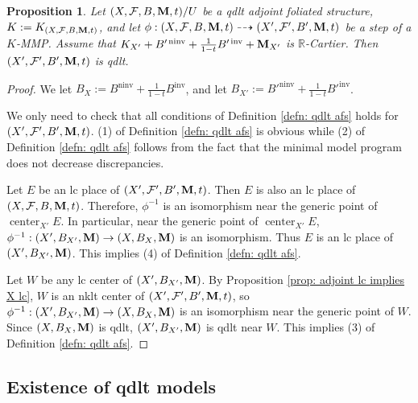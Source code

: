 \documentclass[12pt]{amsart}
\numberwithin{equation}{section}
\newcommand{\Mm}{{\bf{M}}}
\newcommand{\Rr}{\mathbb{R}}
\newcommand{\Center}{\operatorname{center}}
\newcommand{\ninv}{\operatorname{ninv}}
\newcommand{\inv}{\operatorname{inv}}
\newcommand{\Ff}{\mathcal{F}}
\newtheorem{prop}[thm]{Proposition}
\theoremstyle{definition}
\theoremstyle{definition}
\theoremstyle{definition}
\begin{document}
\begin{prop}\label{prop: qdlt preserved under mmp}
    Let $(X,\Ff,B,\Mm,t)/U$ be a qdlt adjoint foliated structure, $K:=K_{(X,\Ff,B,\Mm,t)}$, and let $\phi: (X,\Ff,B,\Mm,t)\dashrightarrow (X',\Ff',B',\Mm,t)$ be a step of a $K$-MMP. Assume that $K_{X'}+B'^{\ninv}+\frac{1}{1-t}B'^{\inv}+\Mm_{X'}$ is $\Rr$-Cartier. Then $(X',\Ff',B',\Mm,t)$ is qdlt.
\end{prop}
\begin{proof}
    We let $B_X:=B^{\ninv}+\frac{1}{1-t}B^{\inv}$, and let $B_{X'}:=B'^{\ninv}+\frac{1}{1-t}B'^{\inv}$.
    
    We only need to check that all conditions of Definition \ref{defn: qdlt afs} holds for $(X',\Ff',B',\Mm,t)$. (1) of Definition \ref{defn: qdlt afs} is obvious while (2) of Definition \ref{defn: qdlt afs} follows from the fact that the minimal model program does not decrease discrepancies. 

    Let $E$ be an lc place of $(X',\Ff',B',\Mm,t)$. Then $E$ is also an lc place of $(X,\Ff,B,\Mm,t)$. Therefore, $\phi^{-1}$ is an isomorphism near the generic point of $\Center_{X'}E$. In particular, near the generic point of $\Center_{X'}E$, $\phi^{-1}:(X',B_{X'},\Mm)\rightarrow (X,B_X,\Mm)$ is an isomorphism. Thus $E$ is an lc place of $(X',B_{X'},\Mm)$. This implies (4) of Definition \ref{defn: qdlt afs}. 
    
    Let $W$ be any lc center of $(X',B_{X'},\Mm)$. By Proposition \ref{prop: adjoint lc implies X lc}, $W$ is an nklt center of $(X',\Ff',B',\Mm,t)$, so $\phi^{-1}:(X',B_{X'},\Mm)\rightarrow (X,B_X,\Mm)$ is an isomorphism near the generic point of $W$. Since $(X,B_X,\Mm)$ is qdlt, $(X',B_{X'},\Mm)$ is qdlt near $W$. This implies (3) of Definition \ref{defn: qdlt afs}. 
\end{proof}


\subsection{Existence of qdlt models}
\end{document}
